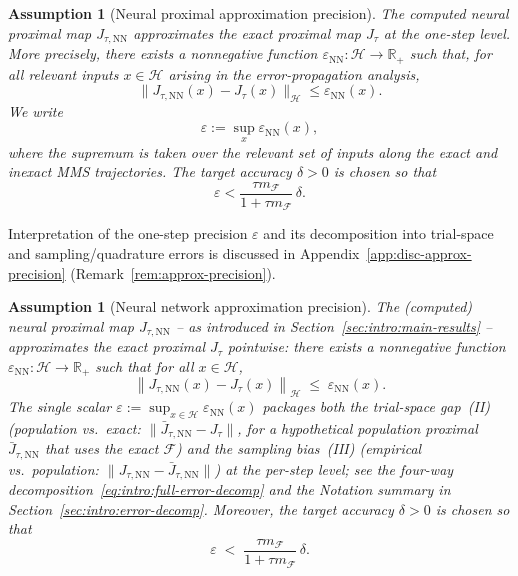 \documentclass[twoside,11pt]{article}
\newtheorem{assumption}[theorem]{Assumption}
\newcommand{\nm}[1]{\left\lVert#1\right\rVert}
\newcommand{\NN}{\mathrm{NN}}
\newcommand{\calF}{\mathcal{F}}
\newcommand{\calH}{\mathcal{H}}
\begin{document}
\begin{assumption}[Neural proximal approximation precision]
\label{assm:approx-precision}
The computed neural proximal map $J_{\tau,\NN}$ approximates the exact proximal
map $J_\tau$ at the one-step level. More precisely, there exists a nonnegative
function $\varepsilon_{\NN}:\calH\to\mathbb{R}_+$ such that, for all relevant
inputs $x\in\calH$ arising in the error-propagation analysis,
\begin{equation*}
\|J_{\tau,\NN}(x)-J_\tau(x)\|_\calH
\le
\varepsilon_{\NN}(x).
\end{equation*}
We write
\[
    \varepsilon:=\sup_x \varepsilon_{\NN}(x),
\]
where the supremum is taken over the relevant set of inputs along the exact and
inexact MMS trajectories. The target accuracy $\delta>0$ is chosen so that
\begin{equation}\label{eqn:approximate-error}
\varepsilon
<
\frac{\tau m_{\calF}}{1+\tau m_{\calF}}\,\delta .
\end{equation}
\end{assumption}

Interpretation of the one-step precision $\varepsilon$ and its decomposition into trial-space and sampling/quadrature errors is discussed in Appendix~\ref{app:disc-approx-precision} (Remark~\ref{rem:approx-precision}).


\iffalse
\begin{assumption}[Neural network approximation precision]\label{assm:approx-precision}
The (computed) neural proximal map $J_{\tau,\NN}$ -- as introduced in Section~\ref{sec:intro:main-results} -- approximates the exact proximal $J_\tau$ pointwise: there exists a nonnegative function $\varepsilon_{\NN}:\mathcal{H}\to\mathbb{R}_+$ such that for all $x\in\mathcal{H}$,
\begin{equation*}
\nm{J_{\tau,\NN}(x)-J_\tau(x)}_\calH \;\le\; \varepsilon_{\NN}(x).
\end{equation*}
The single scalar $\varepsilon:=\sup_{x\in\calH}\varepsilon_\NN(x)$ packages both the trial-space gap~(II) (population vs.\ exact: $\|\bar J_{\tau,\NN}-J_\tau\|$, for a hypothetical population proximal $\bar J_{\tau,\NN}$ that uses the exact $\calF$) and the sampling bias~(III) (empirical vs.\ population: $\|J_{\tau,\NN}-\bar J_{\tau,\NN}\|$) at the per-step level; see the four-way decomposition~\eqref{eq:intro:full-error-decomp} and the Notation summary in Section~\ref{sec:intro:error-decomp}. Moreover, the target accuracy $\delta>0$ is chosen so that
\begin{equation}\label{eqn:approximate-error}
\varepsilon \;<\; \frac{\tau m_{\calF}}{1+\tau m_{\calF}}\,\delta.
\end{equation}
\end{assumption}
\end{document}
